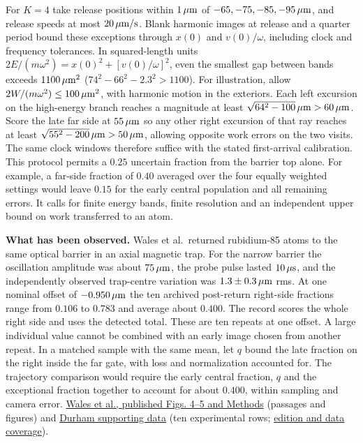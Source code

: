 \documentclass[11pt,a4paper]{article}
\begin{document}
For \(K=4\) take release positions within \(1\,\mu{\rm m}\) of
\(-65,-75,-85,-95\,\mu{\rm m}\), and release speeds at most
\(20\,\mu{\rm m/s}\). Blank harmonic images at release and a quarter
period bound these exceptions through \(x(0)\) and \(v(0)/\omega\),
including clock and frequency tolerances. In squared-length units
\(2E/(m\omega^2)=x(0)^2+[v(0)/\omega]^2\), even the smallest gap between
bands exceeds \(1100\,\mu{\rm m}^2\) (\(74^2-66^2-2.3^2>1100\)). For
illustration, allow \(2W/(m\omega^2)\le100\,\mu{\rm m}^2\), with
harmonic motion in the exteriors. Each left excursion on the high-energy
branch reaches a magnitude at least
\(\sqrt{64^2-100}\,\mu{\rm m}>60\,\mu{\rm m}\). Score the late far side
at \(55\,\mu{\rm m}\) so any other right excursion of that ray reaches
at least \(\sqrt{55^2-200}\,\mu{\rm m}>50\,\mu{\rm m}\), allowing
opposite work errors on the two visits. The same clock windows therefore
suffice with the stated first-arrival calibration. This protocol permits
a \(0.25\) uncertain fraction from the barrier top alone. For example, a
far-side fraction of \(0.40\) averaged over the four equally weighted
settings would leave \(0.15\) for the early central population and all
remaining errors. It calls for finite energy bands, finite resolution
and an independent upper bound on work transferred to an atom.

\textbf{What has been observed.} Wales et al.~returned rubidium-85 atoms
to the same optical barrier in an axial magnetic trap. For the narrow
barrier the oscillation amplitude was about \(75\,\mu{\rm m}\), the
probe pulse lasted \(10\,\mu{\rm s}\), and the independently observed
trap-centre variation was \(1.3\pm0.3\,\mu{\rm m}\) rms. At one nominal
offset of \(-0.950\,\mu{\rm m}\) the ten archived post-return right-side
fractions range from \(0.106\) to \(0.783\) and average about \(0.400\).
The record scores the whole right side and uses the detected total.
These are ten repeats at one offset. A large individual value cannot be
combined with an early image chosen from another repeat. In a matched
sample with the same mean, let \(q\) bound the late fraction on the
right inside the far gate, with loss and normalization accounted for.
The trajectory comparison would require the early central fraction,
\(q\) and the exceptional fraction together to account for about
\(0.400\), within sampling and camera error.
\href{https://doi.org/10.1038/s42005-020-0320-8}{Wales et al., published
Figs. 4--5 and Methods} (passages and figures) and
\href{https://doi.org/10.15128/r1sf2685090}{Durham supporting data} (ten
experimental rows;
\href{../docs/WalesEtAl_SolitonReturn_2020.md}{edition and data
coverage}).
\end{document}
